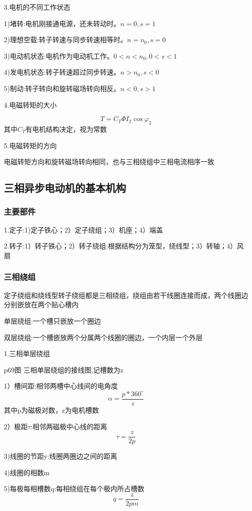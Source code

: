 \documentclass[11pt,twoside,a4paper]{ctexart}
\begin{document}
3.电机的不同工作状态
\begin{minipage}[t]{0.9\linewidth}
    1)堵转:电机刚接通电源，还未转动时。$n = 0,s = 1$

    2)理想空载:转子转速与同步转速相等时。$n = n_0,s = 0$

    3)电动机状态:电机作为电动机工作。$0<n<n_0,0<s<1$

    4)发电机状态:转子转速超过同步转速。$n>n_0,s<0$

    5)制动:转子转向和旋转磁场转向相反。$n<0,s>1$
    
\end{minipage}

4.电磁转矩的大小

\[T = C_T\varPhi I_2 \cos \varphi _2\]
其中$C_T$有电机结构决定，视为常数

5.电磁转矩的方向

电磁转矩方向和旋转磁场转向相同，也与三相绕组中三相电流相序一致

\subsection{三相异步电动机的基本机构}

\subsubsection{主要部件}
1.定子:1)定子铁心；2）定子绕组；3）机座；4）端盖

2.转子:1）转子铁心；2）转子绕组:根据结构分为笼型，绕线型；3）转轴；4）风扇
\subsubsection{三相绕组}
定子绕组和绕线型转子绕组都是三相绕组，绕组由若干线圈连接而成，两个线圈边分别嵌放在两个贴心槽内

单层绕组:一个槽只嵌放一个圈边

双层绕组:一个槽嵌放两个分属两个线圈的圈边，一个内层一个外层

1.三相单层绕组

p69图 三相单层绕组的接线图,记槽数为z

1）槽间距:相邻两槽中心线间的电角度
\[\alpha = \frac{p*360^\circ}{z}\]
其中p为磁极对数，z为电机槽数

2）极距$\tau $:相邻两磁极中心线的距离
\[\tau = \frac{z}{2p}\]

3)线圈的节距y:线圈两圈边之间的距离

4)线圈的相数m

5)每极每相槽数q:每相绕组在每个极内所占槽数
\[q = \frac{z}{2pm}\]
\end{document}
